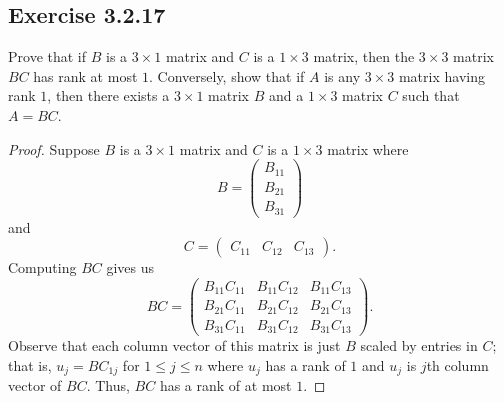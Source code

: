 \subsection*{Exercise 3.2.17} Prove that if \( B  \) is a \( 3 \times 1  \) matrix and \( C  \) is a \( 1 \times 3 \) matrix, then the \( 3 \times 3 \) matrix \( BC  \) has rank at most \( 1  \). Conversely, show that if \( A  \) is any \( 3 \times 3  \) matrix having rank \( 1  \), then there exists a \( 3 \times 1  \) matrix \( B  \) and a \( 1 \times 3  \) matrix \( C  \) such that \( A = BC  \).
\begin{proof}
Suppose \( B  \) is a \( 3 \times 1  \) matrix and \( C  \) is a \( 1 \times 3  \) matrix where 
\[  B = \begin{pmatrix} 
           {B}_{11} \\
           {B}_{21} \\
           {B}_{31}
          \end{pmatrix} \]
          and 
          \[ C = \begin{pmatrix} 
              {C}_{11} & {C}_{12} & {C}_{13} 
                    \end{pmatrix}.  \]
            Computing \( BC  \) gives us
            \[  BC = \begin{pmatrix} 
                {B}_{11} {C}_{11} & {B}_{11} {C}_{12} & {B}_{11} {C}_{13} \\
                {B}_{21}{C}_{11} & {B}_{21} {C}_{12} & {B}_{21} {C}_{13} \\
                {B}_{31} {C}_{11} & {B}_{31}{C}_{12} & {B}_{31} {C}_{13}
                      \end{pmatrix}.  \]
                Observe that each column vector of this matrix is just \( B  \) scaled by entries in \( C \); that is, \( {u}_{j}  = B {C}_{1j}  \) for \( 1 \leq j \leq n  \) where \( {u}_{j} \) has a rank of \( 1  \) and \( {u}_{j} \) is \( j \)th column vector of \( BC \). Thus, \( BC \) has a rank of at most \( 1  \).


\end{proof}
